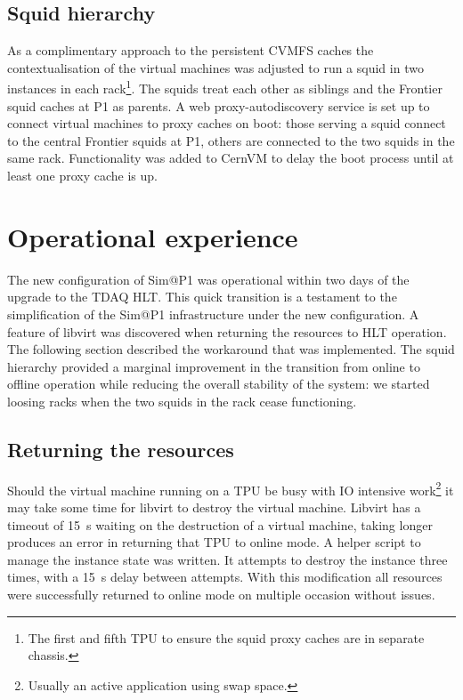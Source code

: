 \documentclass{webofc}
\begin{document}
\subsection{Squid hierarchy}
\label{sec:hierarchy}
As a complimentary approach to the persistent CVMFS caches the contextualisation
of the virtual machines was adjusted to run a squid in two instances in each
rack\footnote{The first and fifth TPU to ensure the squid proxy caches are in
separate chassis.}. The squids treat each other as siblings and the Frontier
squid
caches at P1 as parents. A web proxy-autodiscovery service is set up to
connect virtual machines to proxy caches on boot: those serving a squid
connect to the central Frontier squids at P1, others are connected to the two
squids in the same rack. Functionality was added to CernVM to delay the boot
process until at least one proxy cache is up.


\section{Operational experience}
\label{sec:ops}
The new configuration of Sim@P1 was operational within two days of the upgrade
to the TDAQ HLT. This quick transition is a testament to the simplification of
the Sim@P1 infrastructure under the new configuration. A feature of libvirt was
discovered when
returning the resources to HLT operation. The following section described the
workaround that was implemented. The squid hierarchy provided a marginal
improvement in the transition from online to offline operation while reducing
the
overall stability of the system: we started loosing racks when the two squids in
the rack cease functioning.

\subsection{Returning the resources}
\label{sec:return}
Should the virtual machine running on a TPU be busy with IO intensive
work\footnote{Usually an active application using swap space.} it may take some
time
for libvirt to destroy the virtual machine. Libvirt has a timeout of
15~\textrm{s} waiting
on the destruction of a virtual machine, taking longer produces an error in
returning that TPU to online mode. A helper script to manage the instance state
was written. It attempts to destroy the instance three
times, with a 15~\textrm{s} delay between attempts. With this modification all
resources were successfully returned to online mode on multiple occasion without
issues.
\end{document}
